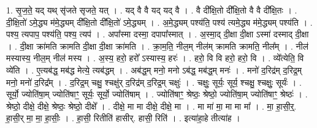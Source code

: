 \documentclass[17pt]{extarticle}
\begin{document}
1. सृ॒ज॒ते॒ यद् यथ् सृ॑जते सृजते॒ यत् । . यद् वै वै यद् यद् वै । . वै दी᳚क्षि॒तो दी᳚क्षि॒तो वै वै दी᳚क्षि॒तः । . दी॒क्षि॒तो॑ ऽमे॒द्ध्य म॑मे॒द्ध्यम् दी᳚क्षि॒तो दी᳚क्षि॒तो॑ ऽमे॒द्ध्यम् । . अ॒मे॒द्ध्यम् पश्य॑ति॒ पश्य॑ त्यमे॒द्ध्य म॑मे॒द्ध्यम् पश्य॑ति । . पश्य॒ त्यपाप॒ पश्य॑ति॒ पश्य॒ त्यप॑ । . अपा᳚स्मा दस्मा॒ दपापा᳚स्मात् । . अ॒स्मा॒द् दी॒क्षा दी॒क्षा ऽस्मा॑ दस्माद् दी॒क्षा । . दी॒क्षा क्रा॑मति क्रामति दी॒क्षा दी॒क्षा क्रा॑मति । . क्रा॒म॒ति॒ नील॒म् नील॑म् क्रामति क्रामति॒ नील᳚म् । . नील॑ मस्यास्य॒ नील॒म् नील॑ मस्य । . अ॒स्य॒ हरो॒ हरो᳚ ऽस्यास्य॒ हरः॑ । . हरो॒ वि वि हरो॒ हरो॒ वि । . व्ये᳚त्येति॒ वि व्ये॑ति । . ए॒त्यब॑द्ध॒ मब॑द्ध मेत्ये॒ त्यब॑द्धम् । . अब॑द्ध॒म् मनो॒ मनो ऽब॑द्ध॒ मब॑द्ध॒म् मनः॑ । . मनो॑ द॒रिद्र॑म् द॒रिद्र॒म् मनो॒ मनो॑ द॒रिद्र᳚म् । . द॒रिद्र॒म् चक्षु॒ श्चक्षु॑र् द॒रिद्र॑म् द॒रिद्र॒म् चक्षुः॑ । . चक्षुः॒ सूर्यः॒ सूर्य॒ श्चक्षु॒ श्चक्षुः॒ सूर्यः॑ । . सूर्यो॒ ज्योति॑षा॒म् ज्योति॑षाꣳ॒॒ सूर्यः॒ सूर्यो॒ ज्योति॑षाम् । . ज्योति॑षाꣳ॒॒ श्रेष्ठः॒ श्रेष्ठो॒ ज्योति॑षा॒म् ज्योति॑षाꣳ॒॒ श्रेष्ठः॑ । . श्रेष्ठो॒ दीक्षे॒ दीक्षे॒ श्रेष्ठः॒ श्रेष्ठो॒ दीक्षे᳚ । . दीक्षे॒ मा मा दीक्षे॒ दीक्षे॒ मा । . मा मा॑ मा॒ मा मा मा᳚ । . मा॒ हा॒सी॒र्॒. हा॒सी॒र् मा॒ मा॒ हा॒सीः॒ । . हा॒सी॒ रितीति॑ हासीर्. हासी॒ रिति॑ । . इत्या॑हा॒हे तीत्या॑ह । \newline
\end{document}
